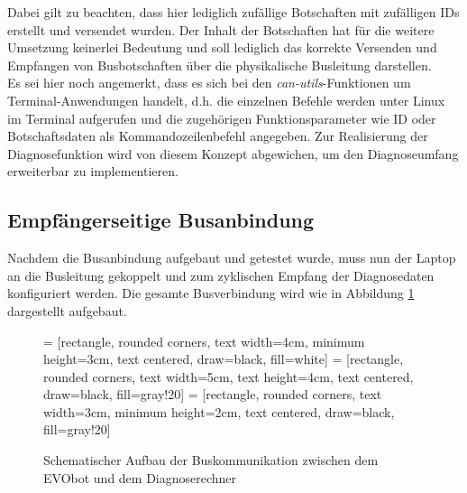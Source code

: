 Dabei gilt zu beachten, dass hier lediglich zufällige Botschaften mit zufälligen IDs erstellt und versendet wurden. Der Inhalt der Botschaften hat für die weitere Umsetzung keinerlei Bedeutung und soll lediglich das korrekte Versenden und Empfangen von Busbotschaften über die physikalische Busleitung darstellen.\\
Es sei hier noch angemerkt, dass es sich bei den \emph{can-utils}-Funktionen um Terminal-Anwendungen handelt, d.h. die einzelnen Befehle werden unter Linux im Terminal aufgerufen und die zugehörigen Funktionsparameter wie ID oder Botschaftsdaten als Kommandozeilenbefehl angegeben. Zur Realisierung der Diagnosefunktion wird von diesem Konzept abgewichen, um den Diagnoseumfang erweiterbar zu implementieren.


\subsection{Empfängerseitige Busanbindung} \label{subsec:EmpfängerseitigeBusanbindung}
Nachdem die Busanbindung aufgebaut und getestet wurde, muss nun der Laptop an die Busleitung gekoppelt und zum zyklischen Empfang der Diagnosedaten konfiguriert werden. Die gesamte Busverbindung wird wie in Abbildung \ref{abb:AufbauBuskommunikation} dargestellt aufgebaut. 

\begin{figure}[!htbp]
	\centering
	 = [rectangle, rounded corners, text width=4cm, minimum height=3cm, text centered, draw=black, fill=white]
	 = [rectangle, rounded corners, text width=5cm, text height=4cm, text centered, draw=black, fill=gray!20]
	 = [rectangle, rounded corners, text width=3cm, minimum height=2cm, text centered, draw=black, fill=gray!20]
	\caption{Schematischer Aufbau der Buskommunikation zwischen dem EVObot und dem Diagnoserechner}
	\label{abb:AufbauBuskommunikation}
\end{figure}

